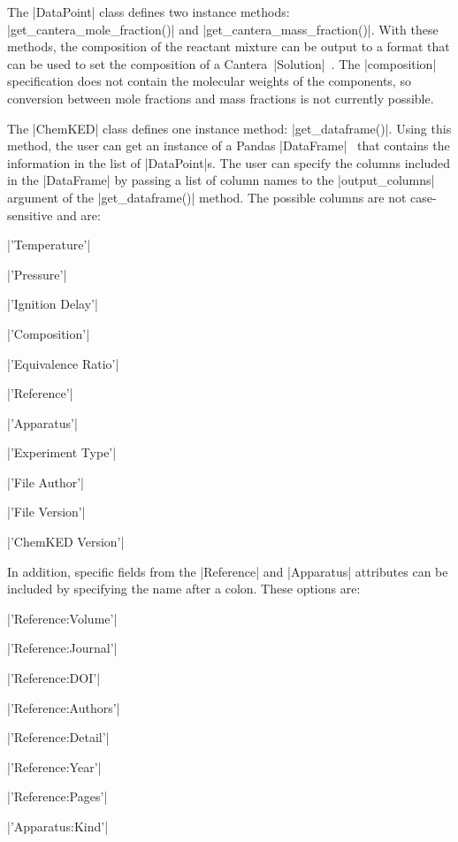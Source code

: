 \documentclass[12pt]{ijck}
\begin{document}
The \pybox|DataPoint| class defines two instance methods:
\pybox|get_cantera_mole_fraction()| and \pybox|get_cantera_mass_fraction()|.
With these methods, the composition of the reactant mixture can be output to a
format that can be used to set the composition of a
Cantera~\pybox|Solution|~\autocite{Cantera:2.3.0}.
The \pybox|composition| specification does not contain the molecular
weights of the components, so conversion between mole fractions and mass
fractions is not currently possible.

The \pybox|ChemKED| class defines one instance method:
\pybox|get_dataframe()|. Using this method, the user can get an instance of a
Pandas \pybox|DataFrame|~\autocite{pandas} that contains the information in the
list of \pybox|DataPoint|s. The user can specify the columns included in the
\pybox|DataFrame| by passing a list of column names to the
\pybox|output_columns| argument of the \pybox|get_dataframe()| method. The
possible columns are not case-sensitive and are:

\noindent\begin{itemize*}
    \item \pybox|'Temperature'|
    \item \pybox|'Pressure'|
    \item \pybox|'Ignition Delay'|
    \item \pybox|'Composition'|
    \item \pybox|'Equivalence Ratio'|
    \item \pybox|'Reference'|
    \item \pybox|'Apparatus'|
    \item \pybox|'Experiment Type'|
    \item \pybox|'File Author'|
    \item \pybox|'File Version'|
    \item \pybox|'ChemKED Version'|
\end{itemize*}

In addition, specific fields from the \pybox|Reference| and \pybox|Apparatus|
attributes can be included by specifying the name after a colon. These options
are:

\noindent\begin{itemize*}
    \item \pybox|'Reference:Volume'|
    \item \pybox|'Reference:Journal'|
    \item \pybox|'Reference:DOI'|
    \item \pybox|'Reference:Authors'|
    \item \pybox|'Reference:Detail'|
    \item \pybox|'Reference:Year'|
    \item \pybox|'Reference:Pages'|
    \item \pybox|'Apparatus:Kind'|
\end{itemize*}
\end{document}
